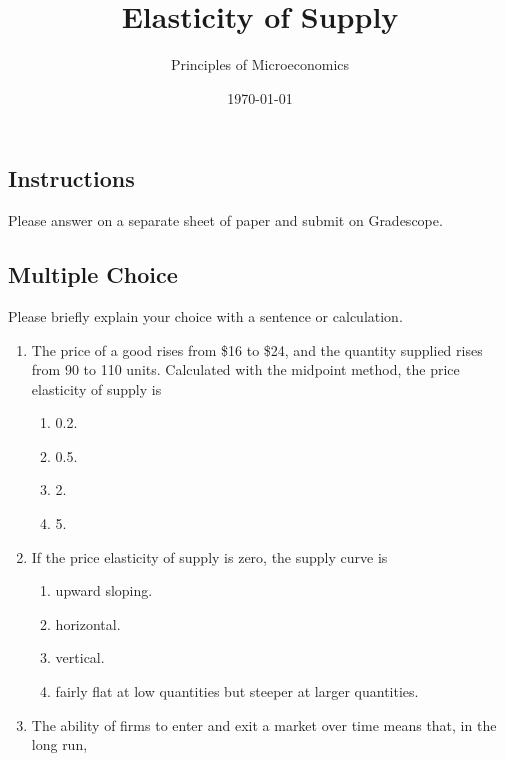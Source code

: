 \documentclass{article}
\title{Elasticity of Supply}
\author{Principles of Microeconomics}
\date{\today}
\begin{document}
\maketitle

\subsection*{Instructions} Please answer on a separate sheet of paper and submit on Gradescope.

\subsection*{Multiple Choice} Please briefly explain your choice with a sentence or calculation.

\begin{enumerate}

\item The price of a good rises from \$16 to \$24, and the quantity supplied rises from 90 to 110 units. Calculated with the midpoint method, the price elasticity of supply is

	\begin{enumerate}
	
	\item 0.2.
	
	\item 0.5.
	
	\item 2.
	
	\item 5.	
	
	\end{enumerate}
	
\item If the price elasticity of supply is zero, the supply curve is

	\begin{enumerate}
	
	\item upward sloping.
	
	\item horizontal.
	
	\item vertical.
	
	\item fairly flat at low quantities but steeper at larger quantities.
	
	\end{enumerate}
	
\item The ability of firms to enter and exit a market over time means that, in the long run,


\end{enumerate}
\end{document}
